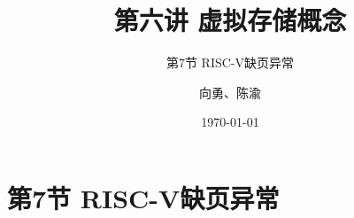 


\title[第6讲]{第六讲 虚拟存储概念} %
\subtitle{第7节 RISC-V缺页异常}
\author{向勇、陈渝} %
\date{\today} %



\begin{frame}
\titlepage %
\end{frame}


\section{第7节 RISC-V缺页异常}%


